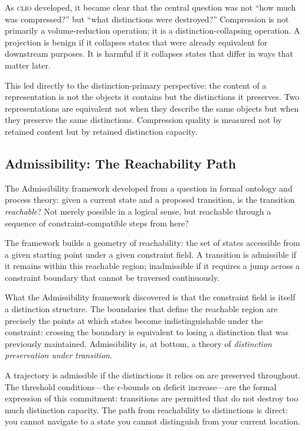 \documentclass[12pt, letterpaper]{article}
\theoremstyle{remark}
\newcommand{\clio}{\textsc{clio}}
\begin{document}
As \clio{} developed, it became clear that the central question was not
``how much was compressed?'' but ``what distinctions were destroyed?''
Compression is not primarily a volume-reduction operation; it is a
distinction-collapsing operation.  A projection is benign if it collapses
states that were already equivalent for downstream purposes.  It is harmful
if it collapses states that differ in ways that matter later.

This led directly to the distinction-primary perspective: the content of a
representation is not the objects it contains but the distinctions it
preserves.  Two representations are equivalent not when they describe the
same objects but when they preserve the same distinctions.  Compression
quality is measured not by retained content but by retained distinction
capacity.

\subsection{Admissibility: The Reachability Path}

The Admissibility framework developed from a question in formal ontology and
process theory: given a current state and a proposed transition, is the
transition \emph{reachable}?  Not merely possible in a logical sense, but
reachable through a sequence of constraint-compatible steps from here?

The framework builds a geometry of reachability: the set of states accessible
from a given starting point under a given constraint field.  A transition is
admissible if it remains within this reachable region; inadmissible if it
requires a jump across a constraint boundary that cannot be traversed
continuously.

What the Admissibility framework discovered is that the constraint field is
itself a distinction structure.  The boundaries that define the reachable
region are precisely the points at which states become indistinguishable
under the constraint: crossing the boundary is equivalent to losing a
distinction that was previously maintained.  Admissibility is, at bottom,
a theory of \emph{distinction preservation under transition}.

A trajectory is admissible if the distinctions it relies on are preserved
throughout.  The threshold conditions---the $\epsilon$-bounds on deficit
increase---are the formal expression of this commitment: transitions are
permitted that do not destroy too much distinction capacity.  The path from
reachability to distinctions is direct: you cannot navigate to a state you
cannot distinguish from your current location.
\end{document}
